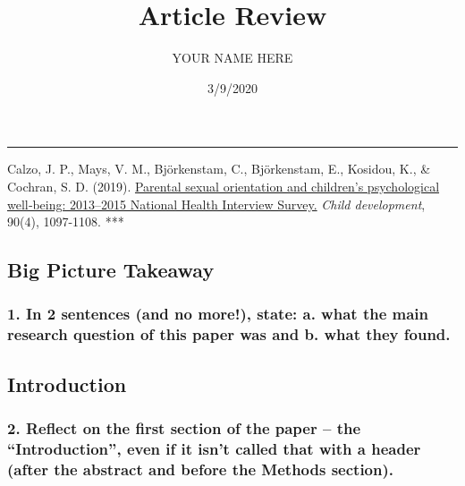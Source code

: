 \documentclass[]{article}
\title{Article Review}
\author{YOUR NAME HERE}
\date{3/9/2020}
\begin{document}
\maketitle

\begin{center}\rule{0.5\linewidth}{0.5pt}\end{center}

Calzo, J. P., Mays, V. M., Björkenstam, C., Björkenstam, E., Kosidou,
K., \& Cochran, S. D. (2019).
\href{https://srcd-onlinelibrary-wiley-com.libproxy.smith.edu/doi/full/10.1111/cdev.12989}{Parental
sexual orientation and children's psychological well‐being: 2013--2015
National Health Interview Survey.} \emph{Child development}, 90(4),
1097-1108. ***

\hypertarget{big-picture-takeaway}{%
\subsection{Big Picture Takeaway}\label{big-picture-takeaway}}

\hypertarget{in-2-sentences-and-no-more-state-a.-what-the-main-research-question-of-this-paper-was-and-b.-what-they-found.}{%
\subsubsection{1. In 2 sentences (and no more!), state: a. what the main
research question of this paper was and b. what they
found.}\label{in-2-sentences-and-no-more-state-a.-what-the-main-research-question-of-this-paper-was-and-b.-what-they-found.}}

\hypertarget{introduction}{%
\subsection{Introduction}\label{introduction}}

\hypertarget{reflect-on-the-first-section-of-the-paper-the-introduction-even-if-it-isnt-called-that-with-a-header-after-the-abstract-and-before-the-methods-section.}{%
\subsubsection{\texorpdfstring{2. Reflect on the first section of the
paper -- the ``\textbf{Introduction}'', even if it isn't called that
with a header (after the abstract and before the Methods
section).}{2. Reflect on the first section of the paper -- the ``Introduction'', even if it isn't called that with a header (after the abstract and before the Methods section).}}\label{reflect-on-the-first-section-of-the-paper-the-introduction-even-if-it-isnt-called-that-with-a-header-after-the-abstract-and-before-the-methods-section.}}
\end{document}

